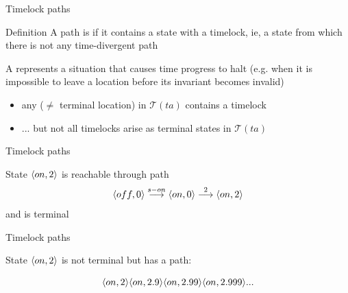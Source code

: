\documentclass[aspectratio=169]{beamer}
\def\TL#1{\mathcal{T}(#1)}
\def\tran#1{\stackrel{#1}{\longrightarrow}}
\begin{document}
\begin{slide}{Timelock paths}
\small

\begin{block}{Definition}
A path is  if it contains a state with a timelock, ie, a \alert{state
from which there is not any time-divergent path}
\vspace{0.3cm}

A  represents a situation that causes time progress to halt (e.g. when it is impossible to leave a location before its invariant becomes invalid)
\end{block}

\begin{itemize}
\item any  ($\neq$ terminal location) in $\TL{ta}$ contains a timelock
\item ... but not all timelocks arise as terminal states in $\TL{ta}$
\end{itemize}
\end{slide}



\begin{slide}{Timelock paths}
\small

\begin{center}
\end{center}

State $\langle on,2 \rangle$ is reachable through path 
$$\pair{off,0} \tran{s-on} \pair{on,0} \tran{2} \pair{on,2}$$
and is terminal

\end{slide}

\begin{slide}{Timelock paths}
\small


\begin{center}
\end{center}

State $\langle on,2 \rangle$ is not terminal but has a  path:

$$\langle on,2 \rangle \langle on,2.9 \rangle  \langle on,2.99 \rangle  \langle on,2.999 \rangle  ...$$

\end{slide}
\end{document}
